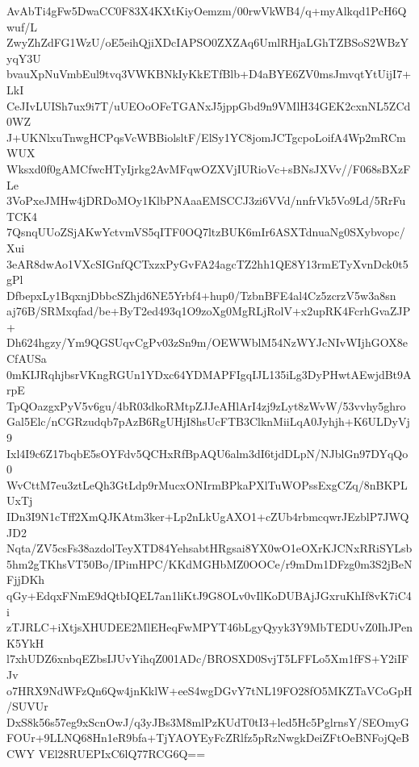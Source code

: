 AvAbTi4gFw5DwaCC0F83X4KXtKiyOemzm/00rwVkWB4/q+myAlkqd1PcH6Qwuf/L
ZwyZhZdFG1WzU/oE5eihQjiXDcIAPSO0ZXZAq6UmlRHjaLGhTZBSoS2WBzYyqY3U
bvauXpNuVmbEul9tvq3VWKBNkIyKkETfBlb+D4aBYE6ZV0msJmvqtYtUijI7+LkI
CeJIvLUISh7ux9i7T/uUEOoOFeTGANxJ5jppGbd9n9VMlH34GEK2cxnNL5ZCd0WZ
J+UKNlxuTnwgHCPqsVcWBBiolsltF/ElSy1YC8jomJCTgcpoLoifA4Wp2mRCmWUX
Wksxd0f0gAMCfwcHTyIjrkg2AvMFqwOZXVjIURioVc+sBNsJXVv//F068sBXzFLe
3VoPxeJMHw4jDRDoMOy1KlbPNAaaEMSCCJ3zi6VVd/nnfrVk5Vo9Ld/5RrFuTCK4
7QsnqUUoZSjAKwYctvmVS5qITF0OQ7ltzBUK6mIr6ASXTdnuaNg0SXybvopc/Xui
3eAR8dwAo1VXcSIGnfQCTxzxPyGvFA24agcTZ2hh1QE8Y13rmETyXvnDck0t5gPl
DfbepxLy1BqxnjDbbcSZhjd6NE5Yrbf4+hup0/TzbnBFE4al4Cz5zcrzV5w3a8sn
aj76B/SRMxqfad/be+ByT2ed493q1O9zoXg0MgRLjRolV+x2upRK4FcrhGvaZJP+
Dh624hgzy/Ym9QGSUqvCgPv03zSn9m/OEWWblM54NzWYJcNIvWIjhGOX8eCfAUSa
0mKIJRqhjbsrVKngRGUn1YDxc64YDMAPFIgqIJL135iLg3DyPHwtAEwjdBt9ArpE
TpQOazgxPyV5v6gu/4bR03dkoRMtpZJJeAHlArI4zj9zLyt8zWvW/53vvhy5ghro
Gal5Elc/nCGRzudqb7pAzB6RgUHjI8hsUcFTB3ClknMiiLqA0Jyhjh+K6ULDyVj9
Ixl4I9c6Z17bqbE5sOYFdv5QCHxRfBpAQU6alm3dI6tjdDLpN/NJblGn97DYqQo0
WvCttM7eu3ztLeQh3GtLdp9rMucxONIrmBPkaPXlTuWOPssExgCZq/8nBKPLUxTj
IDn3I9N1cTff2XmQJKAtm3ker+Lp2nLkUgAXO1+cZUb4rbmcqwrJEzblP7JWQJD2
Nqta/ZV5csFs38azdolTeyXTD84YehsabtHRgsai8YX0wO1eOXrKJCNxRRiSYLsb
5hm2gTKhsVT50Bo/IPimHPC/KKdMGHbMZ0OOCe/r9mDm1DFzg0m3S2jBeNFjjDKh
qGy+EdqxFNmE9dQtbIQEL7an1liKtJ9G8OLv0vIlKoDUBAjJGxruKhIf8vK7iC4i
zTJRLC+iXtjsXHUDEE2MlEHeqFwMPYT46bLgyQyyk3Y9MbTEDUvZ0IhJPenK5YkH
l7xhUDZ6xnbqEZbsIJUvYihqZ001ADc/BROSXD0SvjT5LFFLo5Xm1fFS+Y2iIFJv
o7HRX9NdWFzQn6Qw4jnKklW+eeS4wgDGvY7tNL19FO28fO5MKZTaVCoGpH/SUVUr
DxS8k56s57eg9xScnOwJ/q3yJBs3M8mlPzKUdT0tI3+led5Hc5PglrnsY/SEOmyG
FOUr+9LLNQ68Hn1eR9bfa+TjYAOYEyFcZRlfz5pRzNwgkDeiZFtOeBNFojQeBCWY
VEl28RUEPIxC6lQ77RCG6Q==
